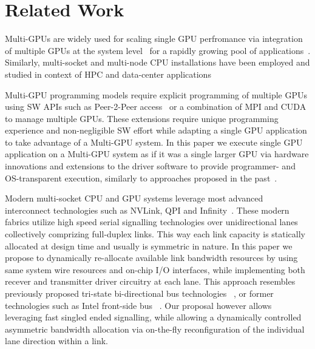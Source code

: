 \section{Related Work}
Multi-GPUs are widely used for scaling single GPU perfromance
via integration of multiple GPUs at the system
level~\cite{pascal-tesla-wp,dgx,intersect360,titan_supercomputer} for a
rapidly growing pool of applications~\cite{coral,cudnn,Lavin15b,SimonyanZ14a}.
Similarly, multi-socket and multi-node CPU
installations have been employed and studied in context of HPC and
data-center applications~\cite{Intel:Xeon,IBM:Power,IBM:z196,AMD:Opteron}

Multi-GPU programming models require explicit programming of multiple GPUs
using SW APIs such as Peer-2-Peer access~\cite{NVIDIAP2P} or a combination of
MPI and CUDA~\cite{NVIDIAMPI} to manage multiple GPUs. These extensions require
unique programming experience and non-negligible SW effort while adapting a
single GPU application to take advantage of a Multi-GPU system. In this paper
we execute single GPU application on a Multi-GPU system as if it was a single
larger GPU via hardware innovations and extensions to the driver software to
provide programmer- and OS-transparent execution, similarly to approaches
proposed in the past~\cite{Cabezas2015,lee2013transparent,ben2015memory}.

Modern multi-socket CPU and GPU systems leverage most advanced interconnect
technologies such as NVLink, QPI and
Infinity~\cite{dgx,INTELQPI,AMDINFINITYFABRIC}. These modern fabrics utilize
high speed serial signalling technologies over unidirectional lanes
collectively comprizing full-duplex links. This way each link capacity is
statically allocated at design time and usually is symmetric in nature. In this
paper we propose to dynamically re-allocate available link bandwidth resources
by using same system wire resources and on-chip I/O interfaces, while
implementing both recever and transmitter driver circuitry at each lane. This
approach resembles previously proposed tri-state bi-directional bus
technologies ~\cite{tri-state}, or former technologies such as Intel front-side
bus ~\cite{fsb}. Our proposal however allows leveraging fast
singled ended signalling, while allowing a dynamically controlled
asymmetric bandwidth allocation via on-the-fly reconfiguration of the
individual lane direction within a link.

